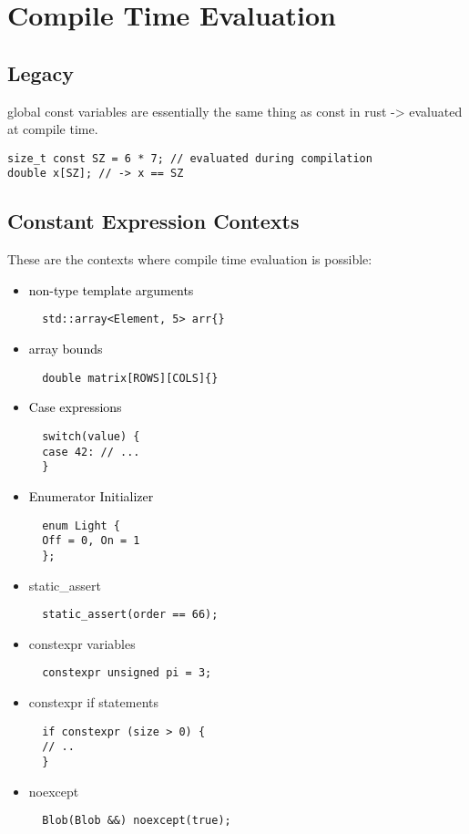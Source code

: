 \documentclass[main.tex,fontsize=8pt,paper=a4,paper=portrait,DIV=calc,]{scrartcl}
\begin{document}
\section{Compile Time Evaluation}

\subsection{Legacy}
global const variables are essentially the same thing as const in rust -> evaluated at compile time.
\begin{lstlisting}
size_t const SZ = 6 * 7; // evaluated during compilation
double x[SZ]; // -> x == SZ
\end{lstlisting}

\subsection{Constant Expression Contexts}
These are the contexts where compile time evaluation is possible:
\begin{itemize}
\item \textcolor{black}{non-type template arguments}\newline
  \begin{lstlisting}
  std::array<Element, 5> arr{}
  \end{lstlisting}
\item \textcolor{black}{array bounds}\newline
  \begin{lstlisting}
  double matrix[ROWS][COLS]{}
  \end{lstlisting}
\item \textcolor{black}{Case expressions}\newline
  \begin{lstlisting}
  switch(value) {
  case 42: // ...
  }
  \end{lstlisting}
\item \textcolor{black}{Enumerator Initializer}\newline
  \begin{lstlisting}
  enum Light {
  Off = 0, On = 1
  };
  \end{lstlisting}
\item static\_assert \newline
  \begin{lstlisting}
  static_assert(order == 66);
  \end{lstlisting}
\item constexpr variables\newlien
  \begin{lstlisting}
  constexpr unsigned pi = 3;
  \end{lstlisting}
\item constexpr if statements\newline
  \begin{lstlisting}
  if constexpr (size > 0) {
  // ..
  }
  \end{lstlisting}
\item noexcept\newline
  \begin{lstlisting}
  Blob(Blob &&) noexcept(true);
  \end{lstlisting}
\end{itemize} 
\end{document}
